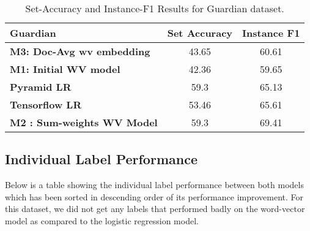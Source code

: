 \begin{table}[htbp]
\centering
\begin{tabular}{l|c|c}
Guardian & \multicolumn{1}{l|}{\textbf{Set Accuracy}} & \textbf{Instance F1} \\ \hline
\textbf{M3: Doc-Avg wv embedding} & 43.65 & 60.61 \\
\textbf{M1: Initial WV model} & 42.36 & 59.65 \\
\textbf{Pyramid LR} & 59.3 & 65.13 \\
\textbf{Tensorflow LR} & 53.46 & 65.61 \\
\textbf{M2 : Sum-weights WV Model} & 59.3 & 69.41
\end{tabular}
\caption{\label{tab:widgets}Set-Accuracy and Instance-F1 Results for Guardian dataset.}
\end{table}

\subsection{Individual Label Performance}

Below is a table showing the individual label performance between both models which has been sorted in descending order of its performance improvement. For this dataset, we did not get any labels that performed badly on the word-vector model as compared to the logistic regression model.\\

